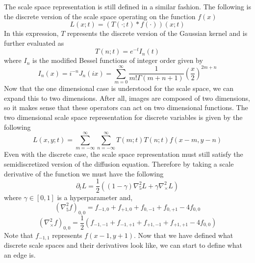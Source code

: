 \documentclass{article}
\begin{document}
The scale space representation is still defined in a similar fashion.
The following is the discrete version of the scale space operating on the function $f(x)$
\begin{equation}
  L(x;t) = (T(\cdot;t) * f(\cdot))(x;t)
\end{equation}
In this expression, $T$ represents the discrete version of the Gaussian kernel and is further evaluated as \cite{Lindeberg1993}
\begin{equation}
  T(n;t) = e^{-t}I_n(t)
\end{equation}
where $I_n$ is the modified Bessel functions of integer order given by
\begin{equation}
  I_n(x) = i^{-n}J_{n}(ix) = \sum_{m=0}^{\infty}\frac{1}{m!\Gamma(m+n+1)}\left(\frac{x}{2}\right)^{2m+n}
\end{equation}
Now that the one dimensional case is understood for the scale space, we can expand this to two dimensions.
After all, images are composed of two dimensions, so it makes sense that these operators can act on two dimensional functions.
The two dimensional scale space representation for discrete variables is given by the following
\begin{equation}
  L(x,y;t) = \sum_{m=-\infty}^{\infty}\sum_{n=-\infty}^{\infty}T(m;t)T(n;t)f(x-m,y-n)
\end{equation}
Even with the discrete case, the scale space representation must still satisfy the semidiscretized version of the diffusion equation.
Therefore by taking a scale derivative of the function we must have the following \cite{Lindeberg1993}
\begin{equation}
  \partial_t L = \frac{1}{2}((1-\gamma)\nabla^2_5L+\gamma\nabla^2_\times L)
\end{equation}
where $\gamma \in [0,1]$ is a hyperparameter and,
\begin{equation}
  (\nabla^2_5f)_{0,0} = f_{-1,0} + f_{+1,0} + f_{0,-1} + f_{0,+1} - 4f_{0,0}
\end{equation}
\begin{equation}
  (\nabla^2_\times f)_{0,0} = \frac{1}{2}(f_{-1,-1} + f_{-1,+1} + f_{+1,-1} + f_{+1,+1} - 4f_{0,0})
\end{equation}
Note that $f_{-1,1}$ represents $f(x-1, y+1)$. Now that we have defined what discrete scale spaces and their derivatives look like, we can start to define what an edge is.
\end{document}
